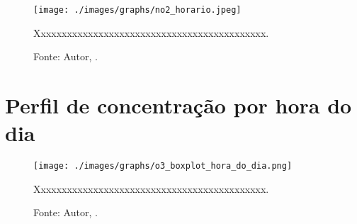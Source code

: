 


\lipsum[100]




\begin{figure}[H]
    \centering
    \texttt{[image: ./images/graphs/no2\_horario.jpeg]}
    \caption{Xxxxxxxxxxxxxxxxxxxxxxxxxxxxxxxxxxxxxxxxxxxx.}
    \label{fig:no2_horario.jpeg}
    \caption*{Fonte: Autor, \imprimirdata.}
\end{figure}




\lipsum[100]



\section{Perfil de concentração por hora do dia}



\lipsum[100]




\begin{figure}[H]
    \centering
    \texttt{[image: ./images/graphs/o3\_boxplot\_hora\_do\_dia.png]}
    \caption{Xxxxxxxxxxxxxxxxxxxxxxxxxxxxxxxxxxxxxxxxxxxx.}
    \label{fig:o3_boxplot_hora_do_dia.png}
    \caption*{Fonte: Autor, \imprimirdata.}
\end{figure}

